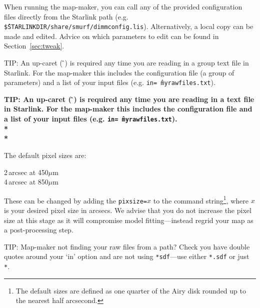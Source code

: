 \documentclass[twoside,11pt]{article}
\newcommand{\htmladdnormallink}[2]{#1}
\newcommand{\htmlref}[2]{#1}
\newenvironment{latexonly}{}{}
\newcommand{\latexhtml}[2]{#1}
\newcommand{\xref}[3]{#1}
\renewcommand{\_}{\texttt{\symbol{95}}}
\newenvironment{fmpage}[1]{\begin{lrbox}{\fmbox}\begin{minipage}{#1}}{\end{minipage}\end{lrbox}\fbox{\usebox{\fmbox}}}
\newcommand{\starlink}{\htmladdnormallink{Starlink}{http://starlink.jach.hawaii.edu}}
\newcommand{\task}[1]{\textsf{#1}}
\newcommand{\file}[1]{\texttt{#1}}
\newcommand{\makemap}{\xref{\task{makemap}}{sun258}{MAKEMAP}}
\newcommand{\smurfsun}{\xref{\textbf{SUN/258}}{sun258}{}}
\newcommand{\cref}[3]{\latexhtml{#1~\ref{#2}}{\htmlref{#3}{#2}}}
\begin{document}
When running the map-maker, you can call any of the provided
configuration files directly from the Starlink path (e.g.
\file{\^\$STARLINK\_DIR/share/smurf/dimmconfig.lis}). Alternatively,
a local copy can be made and edited. Advice on which parameters to
edit can be found in \cref{Section}{sec:tweak}{Tweaking the
configuration file}.

\begin{latexonly}
\begin{center}
\begin{fmpage}{0.95\linewidth}
\vspace{0.1cm}
TIP: An up-caret (\,\^\,) is required any time you are reading in
a  group text file in \starlink. For the map-maker this includes the
configuration file (a group of parameters) and a list of your input files
(e.g. \texttt{in=\^\,myrawfiles.txt}).
\end{fmpage}
\end{center}
\end{latexonly}

\begin{htmlonly}
\textbf{TIP: An up-caret (\,\^\,) is required any time you are reading in
a  text file in \starlink. For the map-maker this includes the
configuration file and a list of your input files (e.g. \texttt{in=\^\,myrawfiles.txt}).\\*\\*}
\end{htmlonly}

The default pixel sizes are:

2\,arcsec at 450$\mu$m\\
4\,arcsec at 850$\mu$m

These can be changed by adding the \texttt{pixsize=}$x$ to the
command string\footnote{The default sizes are defined as one quarter
of the Airy disk rounded up to the nearest half arcsecond.}, where $x$
is your desired pixel size in arcsecs. We advise that you do not
increase the pixel size at this stage as it will compromise model
fitting---instead regrid your map as a post-processing step.


\begin{latexonly}
\begin{center}
\begin{fmpage}{0.95\linewidth}
\vspace{0.1cm}
TIP: Map-maker not finding your raw files from a path? Check you have
double quotes around your `in' option and are not using \texttt{*sdf}---use
either \texttt{*.sdf} or just \texttt{*}.
\end{fmpage}
\end{center}
\end{latexonly}
\end{document}
